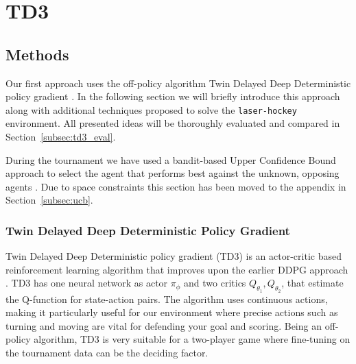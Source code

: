 \section{TD3}

\subsection{Methods}

Our first approach uses the off-policy algorithm Twin Delayed Deep Deterministic policy gradient \cite{fujimoto2018:TD3}. In the following section we will briefly introduce this approach along with additional techniques proposed to solve the \texttt{laser-hockey} environment. All presented ideas will be thoroughly evaluated and compared in Section~\ref{subsec:td3_eval}.

During the tournament we have used a bandit-based Upper Confidence Bound approach to select the agent that performs best against the unknown, opposing agents \cite{agrawal1995SampleMB}. Due to space constraints this section has been moved to the appendix in Section~\ref{subsec:ucb}.

\subsubsection{Twin Delayed Deep Deterministic Policy Gradient}

Twin Delayed Deep Deterministic policy gradient (TD3) is an actor-critic based reinforcement learning algorithm that improves upon the earlier DDPG approach \cite{fujimoto2018:TD3, lillicrap16ddpg}. TD3 has one neural network as actor $\pi_{\phi}$ and two critics $Q_{\theta_1}, Q_{\theta_2}$, that estimate the Q-function for state-action pairs. The algorithm uses continuous actions, making it particularly useful for our environment where precise actions such as turning and moving are vital for defending your goal and scoring. Being an off-policy algorithm, TD3 is very suitable for a two-player game where fine-tuning on the tournament data can be the deciding factor. 

